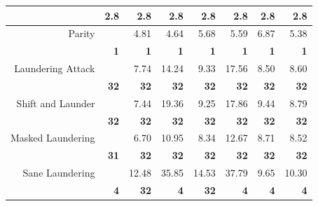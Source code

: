 \begin{figure}
\begin{table}[H]
\begin{tabular}{rr|rrrrrr}
                                      & \textbf{2.8} & \textbf{2.8} & \multicolumn{1}{r|}{\textbf{2.8}} & \textbf{2.8} & \multicolumn{1}{r|}{\textbf{2.8}} & \textbf{2.8}      & \textbf{2.8}     \\ \hline\hline
\multirow{2}{*}{Parity}               &              & 4.81         & \multicolumn{1}{r|}{4.64}         & 5.68         & \multicolumn{1}{r|}{5.59}         & 6.87              & 5.38             \\
                                      & \textbf{1}   & \textbf{1}   & \multicolumn{1}{r|}{\textbf{1}}   & \textbf{1}   & \multicolumn{1}{r|}{\textbf{1}}   & \textbf{1}        & \textbf{1}       \\ \hline
\multirow{2}{*}{Laundering Attack}    &              & 7.74         & \multicolumn{1}{r|}{14.24}        & 9.33         & \multicolumn{1}{r|}{17.56}        & 8.50              & 8.60             \\
                                      & \textbf{32}  & \textbf{32}  & \multicolumn{1}{r|}{\textbf{32}}  & \textbf{32}  & \multicolumn{1}{r|}{\textbf{32}}  & \textbf{32}       & \textbf{32}      \\ \hline
\multirow{2}{*}{Shift and Launder}    &              & 7.44         & \multicolumn{1}{r|}{19.36}        & 9.25         & \multicolumn{1}{r|}{17.86}        & 9.44              & 8.79             \\
                                      & \textbf{32}  & \textbf{32}  & \multicolumn{1}{r|}{\textbf{32}}  & \textbf{32}  & \multicolumn{1}{r|}{\textbf{32}}  & \textbf{32}       & \textbf{32}      \\ \hline
\multirow{2}{*}{Masked Laundering}    &              & 6.70         & \multicolumn{1}{r|}{10.95}        & 8.34         & \multicolumn{1}{r|}{12.67}        & 8.71              & 8.52             \\
                                      & \textbf{31}\footnotemark[5]  & \textbf{32}  & \multicolumn{1}{r|}{\textbf{32}}  & \textbf{32}  & \multicolumn{1}{r|}{\textbf{32}}  & \textbf{32}       & \textbf{32}      \\ \hline
\multirow{2}{*}{Sane Laundering}      &              & 12.48        & \multicolumn{1}{r|}{35.85}        & 14.53        & \multicolumn{1}{r|}{37.79}        & 9.65              & 10.30            \\
                                      & \textbf{4}   & \textbf{32}  & \multicolumn{1}{r|}{\textbf{4}}   & \textbf{32}  & \multicolumn{1}{r|}{\textbf{4}}   & \textbf{4}        & \textbf{4}       \\ \hline\hline

\end{tabular}
\end{table}
\end{figure}
